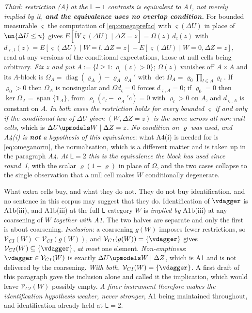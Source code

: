 \emph{Third: restriction \textup{(A)} at the $\mathsf L-1$ contrasts is equivalent to A1, not merely
implied by it, \textbf{and the equivalence uses no overlap condition.}} For bounded measurable
$\varsigma$ the computation of \eqref{eq:omegaprefac} with
$\varsigma(\Delta U)$ in place of $\un\{\Delta U\le u\}$ gives
$E[\widetilde W\varsigma(\Delta U)\mid\Delta Z=z]=\Omega(z)\,d_\varsigma(z)$ with
$d_{\varsigma,l}(z)=E[\varsigma(\Delta U)\mid W=l,\Delta Z=z]-E[\varsigma(\Delta U)\mid W=0,\Delta Z=z]$,
read at any versions of the conditional expectations, those at null cells being arbitrary. \emph{Fix
$z$ and put $A:=\{l\ge1:\varrho_l(z)>0\}$}; $\Omega(z)$ vanishes off $A\times A$ and its $A$-block is
$\Omega_A=\operatorname{diag}(\varrho_A)-\varrho_A\varrho_A'$ with
$\det\Omega_A=\varrho_0\prod_{l\in A}\varrho_l$. If $\varrho_0>0$ then $\Omega_A$ is nonsingular and
$\Omega d_\varsigma=0$ forces $d_{\varsigma,A}=0$; if $\varrho_0=0$ then
$\ker\Omega_A=\operatorname{span}\{\mathbf 1_A\}$, from $\varrho_l(c_l-\varrho_A'c)=0$ with
$\varrho_l>0$ on $A$, and $d_{\varsigma,A}$ is constant on $A$. \emph{In both cases the restriction
holds for every bounded $\varsigma$ if and only if the conditional law of $\Delta U$ given
$(W,\Delta Z=z)$ is the same across all non-null cells}, which is $\Delta U\upmodels W\mid\Delta Z=z$.
\emph{No condition on $\varrho$ was used, and A4(i) is \textbf{not} a hypothesis of this equivalence}:
what A4(i) is needed for is \eqref{eq:omeganorm}, the normalisation, which is a different matter and is
taken up in the paragraph \emph{A4}. \emph{At $\mathsf L=2$ this is the equivalence the block has
used since round~1}, with the scalar $\varrho(1-\varrho)$ in place of $\Omega$, and the two cases
collapse to the single observation that a null cell makes $W$ conditionally degenerate.

What extra cells buy, and what they do not. They do not buy identification, and no sentence
in this corpus may suggest that they do. Identification of $\vdagger$ is A1b(iii), and A1b(iii) at the
full $\mathsf L$-category $W$ is \emph{implied by} A1b(iii) at any coarsening of $W$ \emph{together with
A1}. The two halves are separate and only the first is about coarsening. \emph{Inclusion}: a coarsening
$g(W)$ imposes fewer restrictions, so $\mathcal V_{CI}(W)\subseteq\mathcal V_{CI}(g(W))$, and
$\mathcal V_{CI}(g(W))=\{\vdagger\}$ gives $\mathcal V_{CI}(W)\subseteq\{\vdagger\}$, \emph{at most}
one element. \emph{Non-emptiness}: $\vdagger\in\mathcal V_{CI}(W)$ is exactly
$\Delta U\upmodels W\mid\Delta Z$, which is A1 and is not delivered by the coarsening. \emph{With both,
$\mathcal V_{CI}(W)=\{\vdagger\}$.} A first draft of this paragraph gave the inclusion alone and called
it the implication, which would leave $\mathcal V_{CI}(W)$ possibly empty. \emph{A finer
instrument therefore makes the identification hypothesis weaker, never stronger}, A1 being maintained
throughout, and identification
already held at $\mathsf L=2$.


